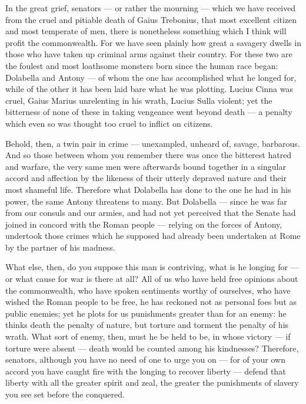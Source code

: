 
 In the great grief, senators --- or rather the mourning --- which we have received from the cruel and pitiable death of Gaius Trebonius, that most excellent citizen and most temperate of men, there is nonetheless something which I think will profit the commonwealth. For we have seen plainly how great a savagery dwells in those who have taken up criminal arms against their country. For these two are the foulest and most loathsome monsters born since the human race began: Dolabella and Antony --- of whom the one has accomplished what he longed for, while of the other it has been laid bare what he was plotting. Lucius Cinna was cruel, Gaius Marius unrelenting in his wrath, Lucius Sulla violent; yet the bitterness of none of these in taking vengeance went beyond death --- a penalty which even so was thought too cruel to inflict on citizens.

 Behold, then, a twin pair in crime --- unexampled, unheard of, savage, barbarous. And so those between whom you remember there was once the bitterest hatred and warfare, the very same men were afterwards bound together in a singular accord and affection by the likeness of their utterly depraved nature and their most shameful life. Therefore what Dolabella has done to the one he had in his power, the same Antony threatens to many. But Dolabella --- since he was far from our consuls and our armies, and had not yet perceived that the Senate had joined in concord with the Roman people --- relying on the forces of Antony, undertook those crimes which he supposed had already been undertaken at Rome by the partner of his madness.

 What else, then, do you suppose this man is contriving, what is he longing for --- or what cause for war is there at all? All of us who have held free opinions about the commonwealth, who have spoken sentiments worthy of ourselves, who have wished the Roman people to be free, he has reckoned not as personal foes but as public enemies; yet he plots for us punishments greater than for an enemy: he thinks death the penalty of nature, but torture and torment the penalty of his wrath. What sort of enemy, then, must he be held to be, in whose victory --- if torture were absent --- death would be counted among his kindnesses? Therefore, senators, although you have no need of one to urge you on --- for of your own accord you have caught fire with the longing to recover liberty --- defend that liberty with all the greater spirit and zeal, the greater the punishments of slavery you see set before the conquered.

